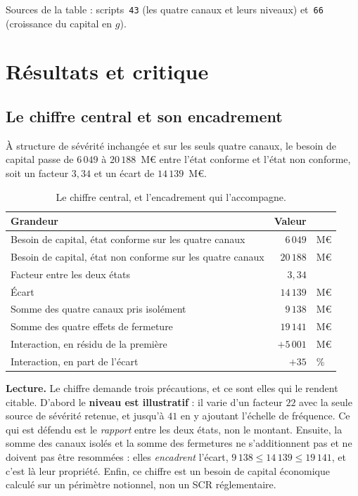 \documentclass[12pt,a4paper]{article}
\theoremstyle{definition}
\begin{document}
\vspace{4pt}
\noindent Sources de la table : scripts~\texttt{43} (les quatre canaux et leurs
niveaux) et~\texttt{66} (croissance du capital en $g$).

\section{Résultats et critique}
\label{s:resultats}

\subsection{Le chiffre central et son encadrement}
\label{ss:chiffre}

À structure de sévérité inchangée et sur les seuls quatre canaux, le besoin de
capital passe de $6\,049$ à $20\,188$~M\euro{} entre l'état conforme et l'état non
conforme, soit un facteur $3{,}34$ et un écart de $14\,139$~M\euro.

\begin{table}[htbp]
\centering\small
\renewcommand{\arraystretch}{1.2}
\begin{tabular}{@{}>{\raggedright\arraybackslash}p{8.4cm}rl@{}}
\toprule
\textbf{Grandeur} & \textbf{Valeur} & \\
\midrule
Besoin de capital, état conforme sur les quatre canaux & $6\,049$ & M\euro \\
Besoin de capital, état non conforme sur les quatre canaux & $20\,188$ & M\euro \\
Facteur entre les deux états & $3{,}34$ & \\
Écart & $14\,139$ & M\euro \\
\midrule
Somme des quatre canaux pris isolément & $9\,138$ & M\euro \\
Somme des quatre effets de fermeture & $19\,141$ & M\euro \\
Interaction, en résidu de la première & $+5\,001$ & M\euro \\
Interaction, en part de l'écart & $+35$ & \% \\
\bottomrule
\end{tabular}
\caption{Le chiffre central, et l'encadrement qui l'accompagne.}
\label{tab:chiffre}
\end{table}

\textbf{Lecture.} Le chiffre demande trois précautions, et ce sont elles qui le
rendent citable. D'abord le \textbf{niveau est illustratif} : il varie d'un facteur
$22$ avec la seule source de sévérité retenue, et jusqu'à $41$ en y ajoutant
l'échelle de fréquence. Ce qui est défendu est le \emph{rapport} entre les deux
états, non le montant. Ensuite, la somme des canaux isolés et la somme des
fermetures ne s'additionnent pas et ne doivent pas être resommées : elles
\emph{encadrent} l'écart, $9\,138 \le 14\,139 \le 19\,141$, et c'est là leur
propriété. Enfin, ce chiffre est un besoin de capital économique calculé sur un
périmètre notionnel, non un SCR réglementaire.
\end{document}

